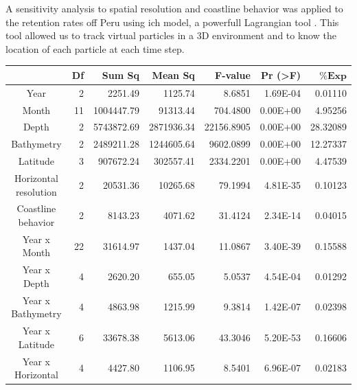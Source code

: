 A sensitivity analysis to spatial resolution and coastline behavior was applied to the retention rates off Peru using \gls{ich} model, a powerfull Lagrangian tool \citep{LettVerl2008}. This tool allowed us to track virtual particles in a 3D environment and to know the location of each particle at each time step.\\

\begin{table}[H]
\centering
\begin{adjustbox}{width=0.9\textwidth}
\small
\begin{tabular}{c|r|r|r|r|r|r}
\hline
                                  &
	\textbf{Df}                   &
	\textbf{Sum Sq}               &
	\textbf{Mean Sq}              &
	\textbf{F-value}    		   &
	\textbf{Pr (\textgreater{F})} &
	$\mathbf{\% Exp}$      \\
\hline
Year                             & 2     & 2251.49    & 1125.74    & 8.6851     & 1.69E-04  & 0.01110  \\
Month                            & 11    & 1004447.79 & 91313.44   & 704.4800   & 0.00E+00  & 4.95256  \\
Depth                            & 2  & 5743872.69 & 2871936.34 & 22156.8905 & 0.00E+00  & 28.32089 \\
Bathymetry                       & 2  & 2489211.28 & 1244605.64 & 9602.0899  & 0.00E+00  & 12.27337 \\
Latitude                         & 3  & 907672.24  & 302557.41  & 2334.2201  & 0.00E+00  & 4.47539  \\
Horizontal resolution            & 2  & 20531.36   & 10265.68   & 79.1994    & 4.81E-35  & 0.10123  \\
Coastline behavior              & 2  & 8143.23    & 4071.62    & 31.4124    & 2.34E-14  & 0.04015  \\
Year x Month                     & 22 & 31614.97   & 1437.04    & 11.0867    & 3.40E-39  & 0.15588  \\
Year x Depth                     & 4  & 2620.20    & 655.05     & 5.0537     & 4.54E-04  & 0.01292  \\
Year x Bathymetry                & 4  & 4863.98    & 1215.99    & 9.3814     & 1.42E-07  & 0.02398  \\
Year x Latitude                  & 6  & 33678.38   & 5613.06    & 43.3046    & 5.20E-53  & 0.16606  \\
Year x Horizontal                & 4  & 4427.80    & 1106.95    & 8.5401     & 6.96E-07  & 0.02183  \\

\end{tabular}
\end{adjustbox}
\end{table}
